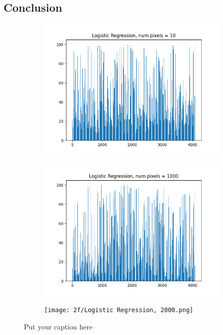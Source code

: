 \documentclass{article}
\begin{document}
\subsection{Conclusion}
\begin{figure}[H]
\begin{subfigure}{.33\textwidth}
  \centering
  \includegraphics[width=1\linewidth]{2e/Logistic Regression, 10.png}  
  
  \label{fig:sub-first}
\end{subfigure}
\begin{subfigure}{.33\textwidth}
  \centering
  \includegraphics[width=1\linewidth]{2e/Logistic Regression, 1000.png}  
  
  \label{fig:sub-second}
\end{subfigure}
\begin{subfigure}{.33\textwidth}
  \centering
  \texttt{[image: 2f/Logistic Regression, 2000.png]}  
  
  \label{fig:sub-second}
\end{subfigure}
\caption{Put your caption here}
\label{feet histo 2e}
\end{figure}
\end{document}
